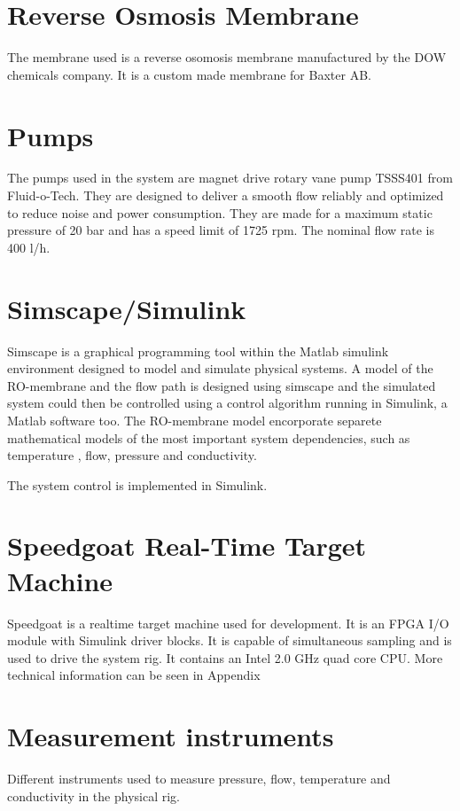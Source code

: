 
\section{Reverse Osmosis Membrane}
The membrane used is a reverse osomosis membrane manufactured by the DOW chemicals company. It is a custom made membrane for Baxter AB. 

\section{Pumps}
The pumps used in the system are magnet drive rotary vane pump TSSS401 from Fluid-o-Tech. They are designed to deliver a smooth flow reliably and optimized to reduce noise and power consumption. They are made for a maximum static pressure of 20 bar and has a speed limit of 1725 rpm. The nominal flow rate is 400 l/h. 

\section{Simscape/Simulink} 
\label{Simscape}

Simscape is a graphical programming tool within the Matlab simulink environment designed to model and simulate physical systems. A model of the RO-membrane and the flow path is designed using simscape and the simulated system could then be controlled using a control algorithm running in Simulink, a Matlab software too. The RO-membrane model encorporate separete mathematical models of the most important system dependencies, such as temperature , flow, pressure and conductivity.  

The system control is implemented in Simulink. 


\section{Speedgoat Real-Time Target Machine}
\label{speedgoat}
Speedgoat is a realtime target machine used for development. It is an FPGA I/O module with Simulink driver blocks. It is capable of simultaneous sampling and is used to drive the system rig. It contains an Intel 2.0 GHz quad core CPU. More technical information can be seen in Appendix 


\section{Measurement instruments} 
\label{measure}
Different instruments used to measure pressure, flow, temperature and conductivity in the physical rig.

